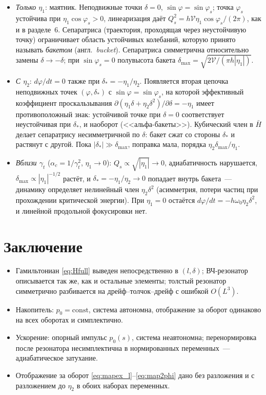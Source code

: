\documentclass[a4paper,11pt]{article}
\numberwithin{equation}{section}
\begin{document}
\begin{itemize}
\item \emph{Только $\eta_1$}: маятник. Неподвижные точки $\delta=0$, $\sin\varphi=\sin\varphi_s$; точка $\varphi_s$
устойчива при $\eta_1\cos\varphi_s>0$, линеаризация даёт $Q_s^2=h\mathcal V\eta_1\cos\varphi_s/(2\pi)$, как и в разделе~6.
Сепаратриса (траектория, проходящая через неустойчивую точку) ограничивает область устойчивых колебаний,
которую принято называть \emph{бакетом} (англ.\ \emph{bucket}). Сепаратриса симметрична относительно замены
$\delta\to-\delta$; при $\sin\varphi_s=0$ полувысота бакета $\delta_{\max}=\sqrt{2\mathcal V/(\pi h|\eta_1|)}$.
\item \emph{С $\eta_2$}: $d\varphi/dt=0$ также при $\delta_*=-\eta_1/\eta_2$. Появляется вторая цепочка неподвижных точек
$(\varphi,\delta_*)$ с $\sin\varphi=\sin\varphi_s$, на которой эффективный коэффициент проскальзывания
$\partial(\eta_1\delta+\eta_2\delta^2)/\partial\delta=-\eta_1$ имеет противоположный знак: устойчивой точке при
$\delta=0$ соответствует неустойчивая при $\delta_*$, и наоборот (<<альфа-бакеты>>). Кубический член в $\bar H$ делает
сепаратрису несимметричной по $\delta$: бакет сжат со стороны $\delta_*$ и растянут с другой.
Пока $|\delta_*|\gg\delta_{\max}$, поправка мала, порядка $\eta_2\delta_{\max}/\eta_1$.
\item \emph{Вблизи $\gamma_t$} ($\alpha_c=1/\gamma_t^2$, $\eta_1\to0$): $Q_s\propto\sqrt{|\eta_1|}\to0$, адиабатичность нарушается,
$\delta_{\max}\propto|\eta_1|^{-1/2}$ растёт, и $\delta_*=-\eta_1/\eta_2\to0$ попадает внутрь бакета~---
динамику определяет нелинейный член $\eta_2\delta^2$ (асимметрия, потери частиц при прохождении
критической энергии). При $\eta_1=0$ остаётся $d\varphi/dt=-h\omega_0\eta_2\delta^2$, и линейной продольной фокусировки нет.
\end{itemize}

\section{Заключение}
\begin{itemize}
\item Гамильтониан \eqref{eq:Hfull} выведен непосредственно в $(l,\delta)$; ВЧ-резонатор описывается так же, как и
остальные элементы; толстый резонатор симметрично разбивается на дрейф--толчок--дрейф с ошибкой $O(L^3)$.
\item Накопитель: $p_0=\mathrm{const}$, система автономна, отображение за оборот одинаково на всех оборотах и симплектично.
\item Ускорение: опорный импульс $p_0(s)$, система неавтономна; перенормировка после резонатора несимплектична в
нормированных переменных~--- адиабатическое затухание.
\item Отображение за оборот \eqref{eq:mapex_l}--\eqref{eq:map2phi} дано без разложения и с разложением до $\eta_2$ в обоих
наборах переменных.
\end{itemize}
\end{document}
